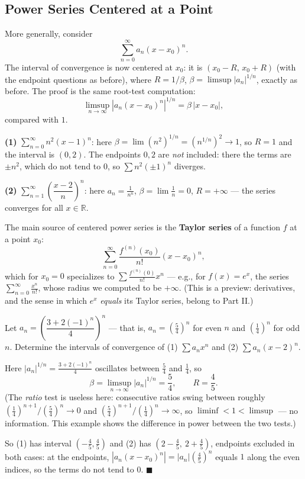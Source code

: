 \documentclass[11pt]{report}
\begin{document}
\subsection{Power Series Centered at a Point}

More generally, consider
\[
\sum_{n=0}^{\infty} a_n (x - x_0)^n.
\]
The interval of convergence is now centered at $x_0$: it is $(x_0 - R,\, x_0 + R)$ (with the endpoint questions as before), where $R = 1/\beta$, $\beta = \limsup |a_n|^{1/n}$, exactly as before. The proof is the same root-test computation:
\[
\limsup_{n\to\infty} |a_n (x-x_0)^n|^{1/n} = \beta\, |x - x_0|,
\]
compared with $1$.

\begin{exbox}
\textbf{(1)} $\sum_{n=0}^\infty n^2 (x-1)^n$: here $\beta = \lim (n^2)^{1/n} = \left(n^{1/n}\right)^2 \to 1$, so $R = 1$ and the interval is $(0, 2)$. The endpoints $0, 2$ are \emph{not} included: there the terms are $\pm n^2$, which do not tend to $0$, so $\sum n^2(\pm1)^n$ diverges.

\textbf{(2)} $\sum_{n=1}^\infty \left( \dfrac{x-2}{n} \right)^n$: here $a_n = \tfrac{1}{n^n}$, $\beta = \lim \tfrac1n = 0$, $R = +\infty$ --- the series converges for all $x \in \mathbb{R}$.
\end{exbox}

\begin{rembox}
The main source of centered power series is the \textbf{Taylor series} of a function $f$ at a point $x_0$:
\[
\sum_{n=0}^\infty \frac{f^{(n)}(x_0)}{n!} (x - x_0)^n,
\]
which for $x_0 = 0$ specializes to $\sum \tfrac{f^{(n)}(0)}{n!} x^n$ --- e.g., for $f(x) = e^x$, the series $\sum_{n=0}^\infty \tfrac{x^n}{n!}$, whose radius we computed to be $+\infty$. (This is a preview: derivatives, and the sense in which $e^x$ \emph{equals} its Taylor series, belong to Part II.)
\end{rembox}

\begin{exbox}
Let $a_n = \left( \dfrac{3 + 2(-1)^n}{4} \right)^n$ --- that is, $a_n = \left(\tfrac54\right)^n$ for even $n$ and $\left(\tfrac14\right)^n$ for odd $n$. Determine the intervals of convergence of (1) $\sum a_n x^n$ and (2) $\sum a_n (x-2)^n$.

Here $|a_n|^{1/n} = \tfrac{3+2(-1)^n}{4}$ oscillates between $\tfrac54$ and $\tfrac14$, so
\[
\beta = \limsup_{n\to\infty} |a_n|^{1/n} = \frac54, \qquad R = \frac45.
\]
(The \emph{ratio} test is useless here: consecutive ratios swing between roughly $\left(\tfrac14\right)^{n+1}/\left(\tfrac54\right)^n \to 0$ and $\left(\tfrac54\right)^{n+1}/\left(\tfrac14\right)^n \to \infty$, so $\liminf < 1 < \limsup$ --- no information. This example shows the difference in power between the two tests.)

So (1) has interval $\left(-\tfrac45, \tfrac45\right)$ and (2) has $\left(2 - \tfrac45,\ 2 + \tfrac45\right)$, endpoints excluded in both cases: at the endpoints, $|a_n(x - x_0)^n| = |a_n| \left(\tfrac45\right)^n$ equals $1$ along the even indices, so the terms do not tend to $0$. \hfill $\blacksquare$
\end{exbox}
\end{document}
